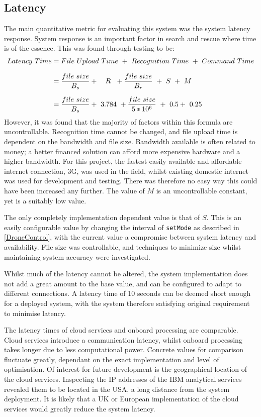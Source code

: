 \documentclass{article}
\begin{document}
\subsection{Latency}
The main quantitative metric for evaluating this system was the system latency response. System response is an important factor in search and rescue where time is of the essence. This was found through testing to be:
\begin{equation*}
\setlength{\jot}{10pt}
\begin{split}
Latency\ Time 	&= File\ Upload\ Time\ +\ Recognition\ Time\ +\ Command\ Time \\
				&= \frac{file\ size}{B_s} +\ \ \ R\ \ + \frac{file\ size}{B_r}\ +\ S\  +\ M \\
				&= \frac{file\ size}{B_s} +\ 3.784\ + \frac{file\ size}{5*10^6}\ +\ 0.5 +\ 0.25 
\end{split}
\end{equation*}
However, it was found that the majority of factors within this formula are uncontrollable. Recognition time cannot be changed, and file upload time is dependent on the bandwidth and file size. Bandwidth available is often related to money; a better financed solution can afford more expensive hardware and a higher bandwidth. For this project, the fastest easily available and affordable internet connection, 3G, was used in the field, whilst existing domestic internet was used for development and testing. There was therefore no easy way this could have been increased any further. The value of $M$ is an uncontrollable constant, yet is a suitably low value. 

The only completely implementation dependent value is that of $S$. This is an easily configurable value by changing the interval of \texttt{setMode} as described in \ref{DroneControl}, with the current value a compromise between system latency and availability. File size was controllable, and techniques to minimize size whilst maintaining system accuracy were investigated. 

Whilst much of the latency cannot be altered, the system implementation does not add a great amount to the base value, and can be configured to adapt to different connections. A latency time of 10 seconds can be deemed short enough for a deployed system, with the system therefore satisfying original requirement to minimise latency. 

The latency times of cloud services and onboard processing are comparable. Cloud services introduce a communication latency, whilst onboard processing takes longer due to less computational power. Concrete values for comparison fluctuate greatly, dependant on the exact implementation and level of optimisation. Of interest for future development is the geographical location of the cloud services. Inspecting the IP addresses of the IBM analytical services revealed them to be located in the USA, a long distance from the system deployment. It is likely that a UK or European implementation of the cloud services would greatly reduce the system latency.
\end{document}
